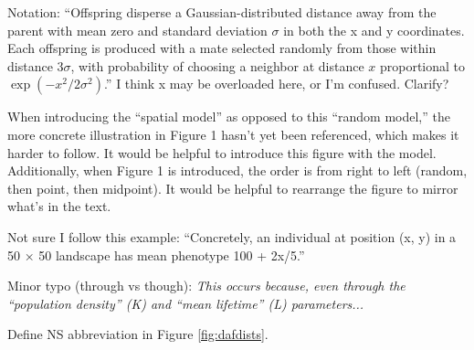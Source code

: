 
\begin{point}{}
    Notation: ``Offspring disperse a Gaussian-distributed distance away from the parent with mean zero and standard deviation $\sigma$ in both the x and y coordinates. Each offspring is produced with a mate selected randomly from those within distance $3\sigma$, with probability of choosing a neighbor at distance $x$ proportional to $\exp(-x^2/2\sigma^2)$.'' I think x may be overloaded here, or I'm confused. Clarify?
\end{point}


\begin{point}{}
    When introducing the ``spatial model'' as opposed to this ``random model,'' the more concrete illustration in Figure 1 hasn't yet been referenced, which makes it harder to follow. It would be helpful to introduce this figure with the model. Additionally, when Figure 1 is introduced, the order is from right to left (random, then point, then midpoint). It would be helpful to rearrange the figure to mirror what's in the text.
\end{point}


\begin{point}{}
    Not sure I follow this example: ``Concretely, an individual at position (x, y) in a 50 × 50 landscape has mean phenotype 100 + 2x/5.''
\end{point}


\begin{point}{}
    Minor typo (through vs though): \emph{This occurs because, even through the ``population density'' (K) and ``mean lifetime'' (L) parameters...}
\end{point}


\begin{point}{}
    Define NS abbreviation in Figure \ref{fig:dafdists}.
\end{point}



